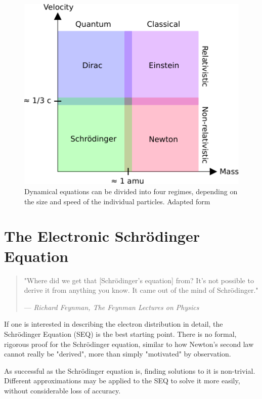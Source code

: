 \begin{figure}
\centering
\includegraphics[scale=1.0]{Pics/dyneq}
\caption[Four regimes of dynamical equations]{Dynamical equations can be divided into four regimes, depending on the size and speed of the individual particles. Adapted form \cite{Jen2017}}
\label{fig:REGIMES}
\end{figure}

\section{The Electronic Schrödinger Equation}

\begin{quote}
  "Where did we get that [Schrödinger's equation] from? It's not possible to derive it from anything you know. It came out of the mind of Schrödinger."
  \begin{flushright}
    \small{--- \textit{Richard Feynman, The Feynman Lectures on Physics}}
  \end{flushright}
\end{quote}

If one is interested in describing the electron distribution in detail, the Schrödinger Equation (SEQ) is the best starting point. There is no formal, rigorous proof for the Schrödinger equation, similar to how Newton's second law cannot really be "derived", more than simply "motivated" by observation. 

As successful as the Schrödinger equation is, finding solutions to it is non-trivial. Different approximations may be applied to the SEQ to solve it more easily, without considerable loss of accuracy. 

